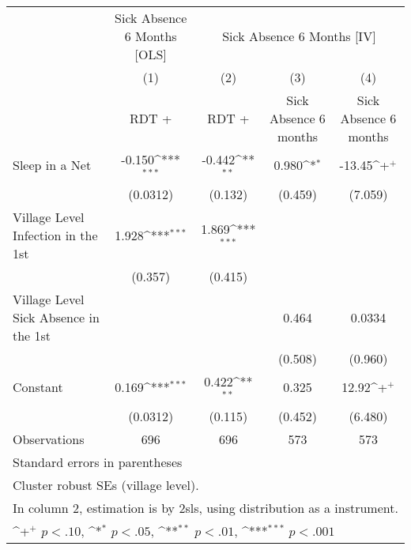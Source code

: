{
\def\sym#1{\ifmmode^{#1}\else\(^{#1}\)\fi}
\begin{tabular}{l*{4}{c}}
\hline\hline
                    &\multicolumn{1}{c}{Sick Absence 6 Months [OLS]}&\multicolumn{3}{c}{Sick Absence 6 Months [IV]}                   \\
                    &\multicolumn{1}{c}{(1)}&\multicolumn{1}{c}{(2)}&\multicolumn{1}{c}{(3)}&\multicolumn{1}{c}{(4)}\\
                    &\multicolumn{1}{c}{RDT +}&\multicolumn{1}{c}{RDT +}&\multicolumn{1}{c}{Sick Absence 6 months}&\multicolumn{1}{c}{Sick Absence 6 months}\\
\hline
Sleep in a Net      &      -0.150\sym{***}&      -0.442\sym{**} &       0.980\sym{*}  &      -13.45\sym{+}  \\
                    &    (0.0312)         &     (0.132)         &     (0.459)         &     (7.059)         \\
[1em]
Village Level Infection in the 1st&       1.928\sym{***}&       1.869\sym{***}&                     &                     \\
                    &     (0.357)         &     (0.415)         &                     &                     \\
[1em]
Village Level Sick Absence in the 1st&                     &                     &       0.464         &      0.0334         \\
                    &                     &                     &     (0.508)         &     (0.960)         \\
[1em]
Constant            &       0.169\sym{***}&       0.422\sym{**} &       0.325         &       12.92\sym{+}  \\
                    &    (0.0312)         &     (0.115)         &     (0.452)         &     (6.480)         \\
\hline
Observations        &         696         &         696         &         573         &         573         \\
\hline\hline
\multicolumn{5}{l}{\footnotesize Standard errors in parentheses}\\
\multicolumn{5}{l}{\footnotesize Cluster robust SEs (village level). }\\
\multicolumn{5}{l}{\footnotesize  In column 2, estimation is by 2sls, using distribution as a instrument.}\\
\multicolumn{5}{l}{\footnotesize \sym{+} \(p<.10\), \sym{*} \(p<.05\), \sym{**} \(p<.01\), \sym{***} \(p<.001\)}\\
\end{tabular}
}
